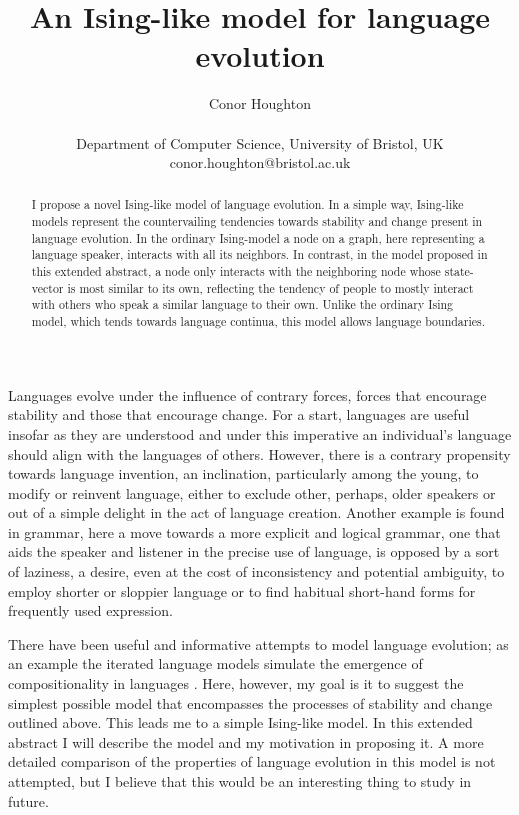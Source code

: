 \documentclass[letterpaper]{article}
\title{An Ising-like model for language evolution}
\author{Conor Houghton \\
\mbox{}\\
Department of Computer Science, University of Bristol, UK\\
conor.houghton@bristol.ac.uk} %
\begin{document}
\maketitle

\begin{abstract}
I propose a novel Ising-like model of language evolution. In a simple way, Ising-like models represent the countervailing tendencies towards stability and change present in language evolution. In the ordinary Ising-model a node on a graph, here representing a language speaker, interacts with all its neighbors. In contrast, in the model proposed in this extended abstract, a node only interacts with the neighboring node whose state-vector is most similar to its own, reflecting the tendency of people to mostly interact with others who speak a similar language to their own. Unlike the ordinary Ising model, which tends towards language continua, this model allows language boundaries. 
\end{abstract}

Languages evolve under the influence of contrary forces, forces that encourage stability and those that encourage change. For a start, languages are useful insofar as they are understood and under this imperative an individual's language should align with the languages of others. However, there is a contrary propensity towards language invention, an inclination, particularly among the young, to modify or reinvent language, either to exclude other, perhaps, older speakers or out of a simple delight in the act of language creation. Another example is found in grammar, here a move towards a more explicit and logical grammar, one that aids the speaker and listener in the precise use of language, is opposed by a sort of laziness, a desire, even at the cost of inconsistency and potential ambiguity, to employ shorter or sloppier language or to find habitual short-hand forms for frequently used expression. 

There have been useful and informative attempts to model language evolution; as an example the iterated language models simulate the emergence of compositionality in languages \cite{KirbyHurford,BraceBullock}. Here, however, my goal is it to suggest the simplest possible model that encompasses the processes of stability and change outlined above. This leads me to a simple Ising-like model. In this extended abstract I will describe the model and my motivation in proposing it. A more detailed comparison of the properties of language evolution in this model is not attempted, but I believe that this would be an interesting thing to study in future.
\end{document}
